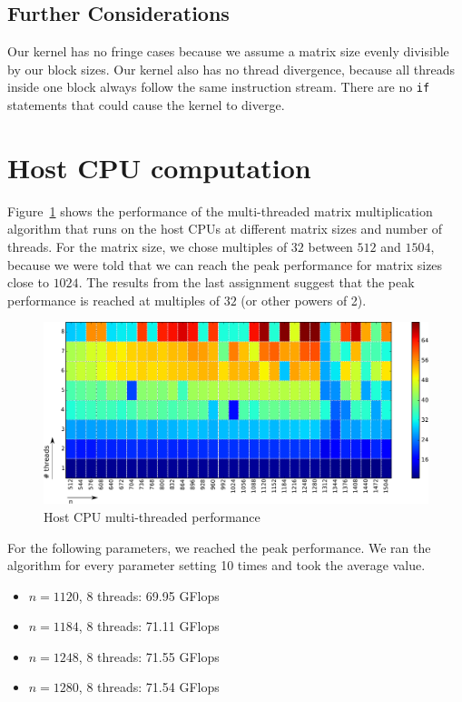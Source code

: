 \documentclass[12pt]{article}
\begin{document}
\subsection{Further Considerations}
Our kernel has no fringe cases because we assume a matrix size evenly divisible by our block sizes. Our kernel also has no thread divergence, because all threads inside one block always follow the same instruction stream. There are no \texttt{if} statements that could cause the kernel to diverge.

\section{Host CPU computation}
Figure~\ref{fig:perf_host} shows the performance of the multi-threaded matrix multiplication algorithm that runs on the host CPUs at different matrix sizes and number of threads. For the matrix size, we chose multiples of $32$ between $512$ and $1504$, because we were told that we can reach the peak performance for matrix sizes close to $1024$. The results from the last assignment suggest that the peak performance is reached at multiples of $32$ (or other powers of 2).

\begin{figure}[H]
\includegraphics[width=\textwidth]{heat_host_cpu.pdf}
\caption{Host CPU multi-threaded performance}
\label{fig:perf_host}
\end{figure}

For the following parameters, we reached the peak performance. We ran the algorithm for every parameter setting 10 times and took the average value.
\begin{itemize}
	\item $n=1120$, 8 threads: 69.95 GFlops
    \item $n=1184$, 8 threads: 71.11 GFlops
    \item $n=1248$, 8 threads: 71.55 GFlops
    \item $n=1280$, 8 threads: 71.54 GFlops
\end{itemize}
\end{document}
